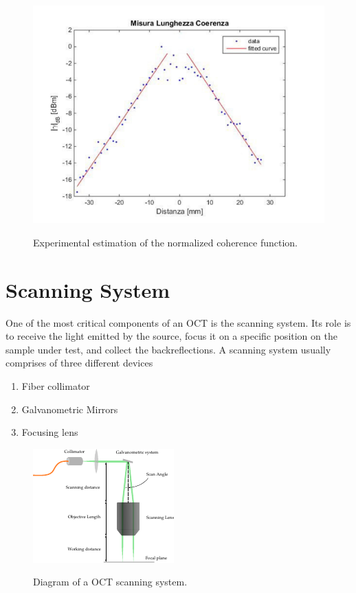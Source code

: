 \begin{figure}[hbt]
	\myfloatalign
	{\includegraphics[width=0.8\linewidth]{gfx/ch3/axsun-coherence-length}}\\
	\caption{Experimental estimation of the normalized coherence function.}\label{fig:axsun-coherence-length}
\end{figure}

\newpage

\section{Scanning System}
One of the most critical components of an OCT is the scanning system. Its role is to receive the light emitted by the source, focus it on a specific position on the sample under test, and collect the backreflections. A scanning system usually comprises of three different devices

\begin{enumerate}
	\item Fiber collimator
	\item Galvanometric Mirrors
	\item Focusing lens
\end{enumerate}

\begin{figure}[bth]
	\myfloatalign
	{\includegraphics[width=0.8\linewidth]{gfx/setup-diagrams/scanning-diagram.pdf}}
	\caption{Diagram of a OCT scanning system.}\label{fig:scanning-diagram}
\end{figure}

